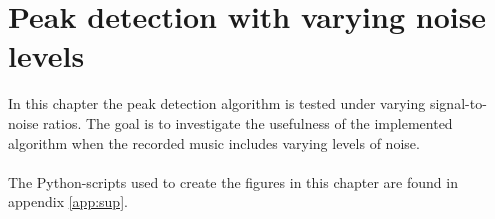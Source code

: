 \chapter{Peak detection with varying noise levels} \label{ch11}
In this chapter the peak detection algorithm is tested under varying signal-to-noise ratios. The goal is to investigate the usefulness of the implemented algorithm when the recorded music includes varying levels of noise.\\\\
The Python-scripts used to create the figures in this chapter are found in appendix \ref{app:sup}.
